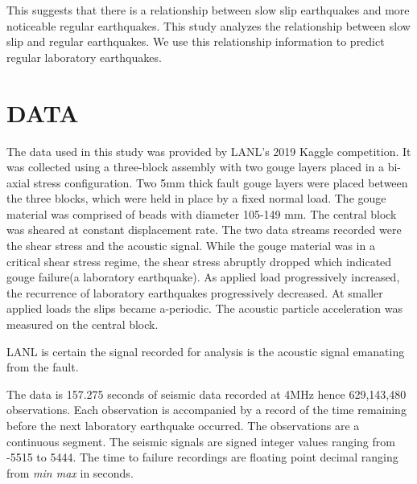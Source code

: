 \documentclass[]{llncs}
\begin{document}
This suggests that there is a relationship between slow slip earthquakes and more noticeable regular earthquakes\cite{SlowSlip}. This study analyzes the relationship between slow slip and regular earthquakes. We use this relationship information to predict regular laboratory earthquakes. \par


\section{DATA} The data used in this study was provided by LANL's 2019 Kaggle competition\cite{kaggle}. It was collected using a three-block assembly with two gouge layers placed in a bi-axial stress configuration. Two 5mm thick fault gouge layers were placed between the three blocks, which were held in place by a fixed normal load. The gouge material was comprised of beads with diameter 105-149 mm. The central block was sheared at constant displacement rate. The two data streams recorded were the shear stress and the acoustic signal. While the gouge material was in a critical shear stress regime, the shear stress abruptly dropped which indicated gouge failure(a laboratory earthquake). As applied load progressively increased, the recurrence of laboratory earthquakes progressively decreased. At smaller applied loads the slips became a-periodic. The acoustic particle acceleration was measured on the central block.\par

LANL is certain the signal recorded for analysis is the acoustic signal emanating from the fault\cite{Bertrand}.\par

The data is 157.275 seconds of seismic data recorded at 4MHz hence 629,143,480 observations. Each observation is accompanied by a record of the time remaining before the next laboratory earthquake occurred. The observations are a continuous segment. The seismic signals are signed integer values ranging from -5515 to 5444. The time to failure recordings are floating point decimal ranging from {\em min max} in seconds. \par
\end{document}
